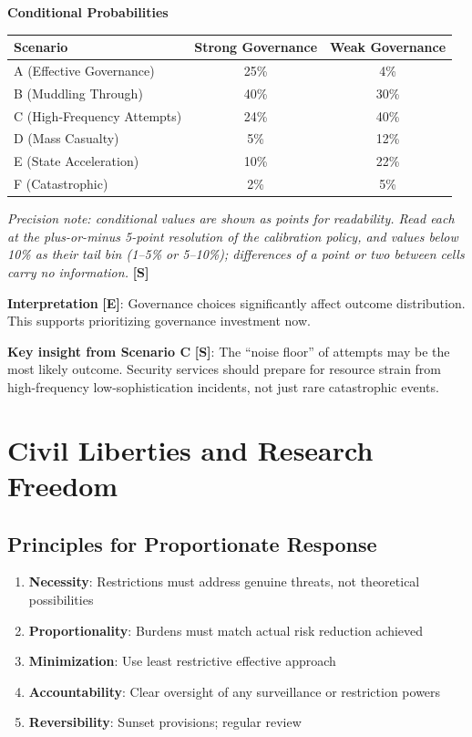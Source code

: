 \documentclass[11pt,letterpaper]{article}
\begin{document}
\begin{center}
\small
\textbf{Conditional Probabilities}\\[0.5em]
\begin{tabular}{lcc}
\toprule
\textbf{Scenario} & \textbf{Strong Governance} & \textbf{Weak Governance} \\
\midrule
A (Effective Governance) & 25\% & 4\% \\
B (Muddling Through) & 40\% & 30\% \\
C (High-Frequency Attempts) & 24\% & 40\% \\
D (Mass Casualty) & 5\% & 12\% \\
E (State Acceleration) & 10\% & 22\% \\
F (Catastrophic) & 2\% & 5\% \\
\bottomrule
\end{tabular}
\end{center}

\textit{Precision note: conditional values are shown as points for readability. Read each at the plus-or-minus 5-point resolution of the calibration policy, and values below 10\% as their tail bin (1--5\% or 5--10\%); differences of a point or two between cells carry no information.} \textbf{[S]}

\textbf{Interpretation} \textbf{[E]}: Governance choices significantly affect outcome distribution. This supports prioritizing governance investment now.

\textbf{Key insight from Scenario C} \textbf{[S]}: The ``noise floor'' of attempts may be the most likely outcome. Security services should prepare for resource strain from high-frequency low-sophistication incidents, not just rare catastrophic events.

\section{Civil Liberties and Research Freedom}

\subsection{Principles for Proportionate Response}

\begin{enumerate}
  \item \textbf{Necessity}: Restrictions must address genuine threats, not theoretical possibilities
  \item \textbf{Proportionality}: Burdens must match actual risk reduction achieved
  \item \textbf{Minimization}: Use least restrictive effective approach
  \item \textbf{Accountability}: Clear oversight of any surveillance or restriction powers
  \item \textbf{Reversibility}: Sunset provisions; regular review
\end{enumerate}
\end{document}
